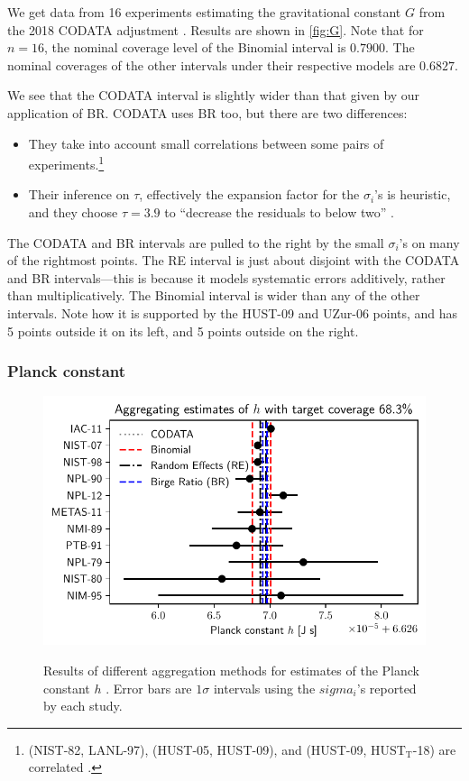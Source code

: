\documentclass[12pt]{article}
\begin{document}
We get data from 16 experiments estimating the gravitational constant $G$ from the 2018 CODATA adjustment \citep[Table XXIX]{tiesinga2021codata}. Results are shown in \ref{fig:G}. Note that for $n=16$, the nominal coverage level of the Binomial interval is $0.7900$. The nominal coverages of the other intervals under their respective models are $0.6827$.

We see that the CODATA interval is slightly wider than that given by our application of BR. CODATA uses BR too, but there are two differences:

\begin{itemize}
\item
  They take into account small correlations between some pairs of experiments.\footnote{(NIST-82, LANL-97), (HUST-05, HUST-09), and (HUST-09, HUST$_\text{T}$-18) are correlated \citep{tiesinga2021codata}.}
\item
  Their inference on $\tau$, effectively the expansion factor for the $\sigma_i$'s is heuristic, and they choose $\tau=3.9$ to ``decrease the residuals to below two'' \citep{tiesinga2021codata}.
\end{itemize}

The CODATA and BR intervals are pulled to the right by the small $\sigma_i$'s on many of the rightmost points. The RE interval is just about disjoint with the CODATA and BR intervals---this is because it models systematic errors additively, rather than multiplicatively. The Binomial interval is wider than any of the other intervals. Note how it is supported by the HUST-09 and UZur-06 points, and has 5 points outside it on its left, and 5 points outside on the right.

\subsubsection{Planck constant}\label{planck-constant}

\begin{figure}[H]
\centering
\includegraphics{figs/h0.pdf}
\label{fig:h}
\caption{Results of different aggregation methods for estimates of the Planck constant $h$ \cite[Table 26]{mohr2012codata}. Error bars are $1\sigma$ intervals using the $sigma_i$'s reported by each study.}
\end{figure}
\end{document}

